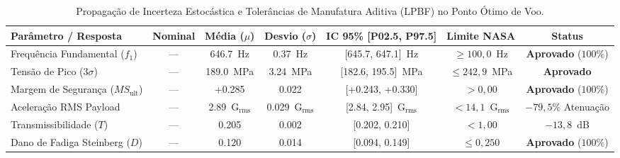 \begin{table}[htbp]
\centering
\caption{Propagação de Incerteza Estocástica e Tolerâncias de Manufatura Aditiva (LPBF) no Ponto Ótimo de Voo.}
\label{tab:incerteza_monte_carlo_voo}
\begin{tabular}{lcccccc}
\toprule
\textbf{Parâmetro / Resposta} & \textbf{Nominal} & \textbf{Média ($\mu$)} & \textbf{Desvio ($\sigma$)} & \textbf{IC 95\% [P02.5, P97.5]} & \textbf{Limite NASA} & \textbf{Status} \\
\midrule
Frequência Fundamental ($f_1$) & — & 646.7~Hz & 0.37~Hz & [645.7, 647.1]~Hz & $\ge 100{,}0$~Hz & \textbf{Aprovado} ($100\%$) \\
Tensão de Pico ($3\sigma$) & — & 189.0~MPa & 3.24~MPa & [182.6, 195.5]~MPa & $\le 242{,}9$~MPa & \textbf{Aprovado} \\
Margem de Segurança ($MS_{\text{ult}}$) & — & +0.285 & 0.022 & [+0.243, +0.330] & $> 0{,}00$ & \textbf{Aprovado} ($100\%$) \\
Aceleração RMS Payload & — & 2.89~G$_{\text{rms}}$ & 0.029~G$_{\text{rms}}$ & [2.84, 2.95]~G$_{\text{rms}}$ & $< 14{,}1$~G$_{\text{rms}}$ & $-79{,}5\%$ Atenuação \\
Transmissibilidade ($T$) & — & 0.205 & 0.002 & [0.202, 0.210] & $< 1{,}00$ & $-13{,}8$~dB \\
Dano de Fadiga Steinberg ($D$) & — & 0.120 & 0.014 & [0.094, 0.149] & $\le 0{,}250$ & \textbf{Aprovado} ($100\%$) \\
\bottomrule
\end{tabular}
\end{table}
